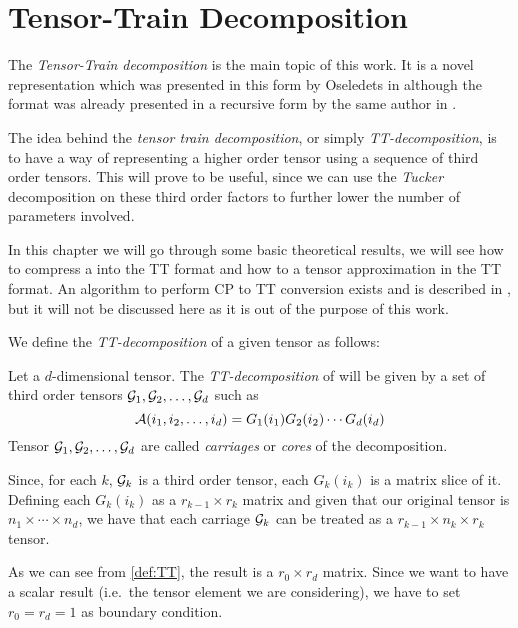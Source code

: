 \chapter{Tensor-Train Decomposition}

The \emph{Tensor-Train decomposition} is the main topic of this work. It is a novel representation which was presented in this form by Oseledets in \cite{oseledets2011tt} although the format was already presented in a recursive form by the same author in \cite{oseledetstyrty2009}.

The idea behind the \emph{tensor train decomposition}, or simply \emph{TT-decomposition}, is to have a way of representing a higher order tensor using a sequence of third order tensors. This will prove to be useful, since we can use the \emph{Tucker} decomposition on these third order factors to further lower the number of parameters involved.

In this chapter we will go through some basic theoretical results, we will see how to compress a  into the TT format and how to  a tensor approximation in the TT format. An algorithm to perform CP to TT conversion exists and is described in \cite{oseledets2011tt}, but it will not be discussed here as it is out of the purpose of this work.

We define the \emph{TT-decomposition} of a given tensor \A as follows:

\begin{Def}
  Let \A a $d$-dimensional tensor. The \emph{TT-decomposition} of \A will be given by a set of third order tensors $\mathcal{G}_1,\mathcal{G}_2,\dots,\mathcal{G}_d$ such as
  \begin{equation} \label{def:TT}
    \mathcal{A}(i_1,i_2,\dots,i_d) = G_1(i_1)G_2(i_2)\cdots G_d(i_d)
  \end{equation}
  Tensor $\mathcal{G}_1,\mathcal{G}_2,\dots,\mathcal{G}_d$ are called \emph{carriages} or \emph{cores} of the decomposition.
\end{Def}

Since, for each $k$, $\mathcal{G}_k$ is a third order tensor, each $G_k(i_k)$ is a matrix slice of it. Defining each $G_k(i_k)$ as a $r_{k-1} \times r_k$ matrix and given that our original tensor \A is $n_1 \times \cdots \times n_d$, we have that each carriage $\mathcal{G}_k$ can be treated as a $r_{k-1} \times n_k \times r_k$ tensor.

As we can see from \ref{def:TT}, the result is a $r_0 \times r_d$ matrix. Since we want to have a scalar result (i.e.\ the tensor element we are considering), we have to set $r_0 = r_d = 1$ as boundary condition.

